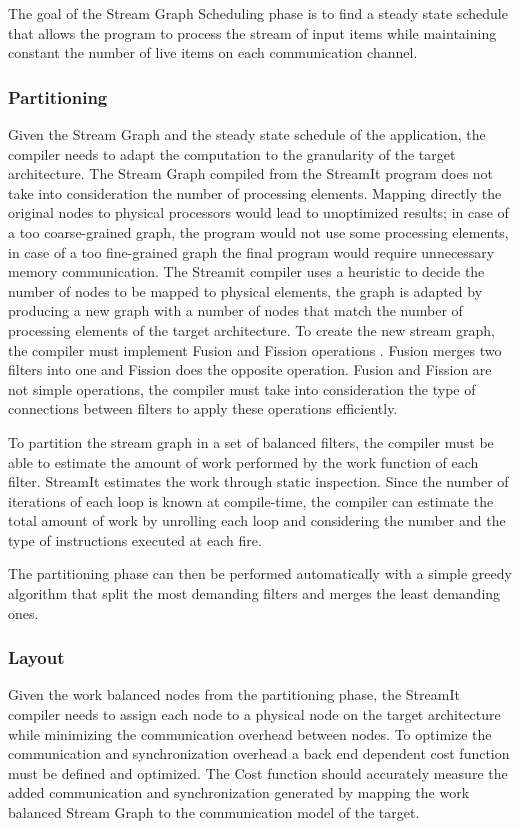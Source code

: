 \documentclass[../main.tex]{subfiles}
\begin{document}
The goal of the Stream Graph Scheduling phase is to find a steady state schedule that allows the program to process the stream of input items while maintaining constant the number of live items on each communication channel.

\subsubsection{Partitioning}
Given the Stream Graph and the steady state schedule of the application, the compiler needs to adapt the computation to the granularity of the target architecture. 
The Stream Graph compiled from the StreamIt program does not take into consideration the number of processing elements. Mapping directly the original nodes to physical processors would lead to unoptimized results; in case of a too coarse-grained graph, the program would not use some processing elements, in case of a too fine-grained graph the final program would require unnecessary memory communication.
The Streamit compiler uses a heuristic to decide the number of nodes to be mapped to physical elements, the graph is adapted by producing a new graph with a number of nodes that match the number of processing elements of the target architecture.
To create the new stream graph, the compiler must implement Fusion and Fission operations \cite{streamit2}. Fusion merges two filters into one and Fission does the opposite operation. Fusion and Fission are not simple operations, the compiler must take into consideration the type of connections between filters to apply these operations efficiently.

To partition the stream graph in a set of balanced filters, the compiler must be able to estimate the amount of work performed by the work function of each filter. StreamIt estimates the work through static inspection. Since the number of iterations of each loop is known at compile-time, the compiler can estimate the total amount of work by unrolling each loop and considering the number and the type of instructions executed at each fire. 

The partitioning phase can then be performed automatically with a simple greedy algorithm that split the most demanding filters and merges the least demanding ones.

\subsubsection{Layout}
Given the work balanced nodes from the partitioning phase, the StreamIt compiler needs to assign each node to a physical node on the target architecture while minimizing the communication overhead between nodes.
To optimize the communication and synchronization overhead a back end dependent cost function must be defined and optimized. The Cost function should accurately measure the added communication and synchronization generated by mapping the work balanced Stream Graph to the communication model of the target. 
\end{document}

